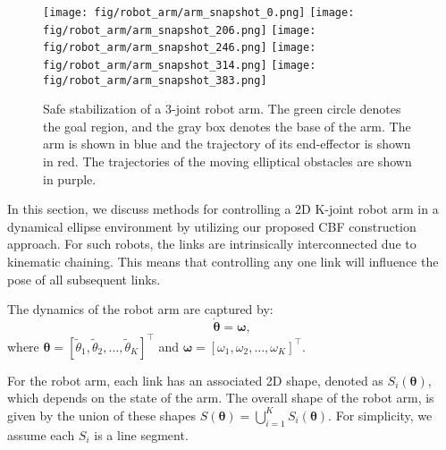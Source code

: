 \begin{figure*}[h]
    \centering
    {\texttt{[image: fig/robot\_arm/arm\_snapshot\_0.png]}}
    {\texttt{[image: fig/robot\_arm/arm\_snapshot\_206.png]}}
    {\texttt{[image: fig/robot\_arm/arm\_snapshot\_246.png]}}
    {\texttt{[image: fig/robot\_arm/arm\_snapshot\_314.png]}}
    {\texttt{[image: fig/robot\_arm/arm\_snapshot\_383.png]}}
    \caption{Safe stabilization of a 3-joint robot arm. The green circle denotes the goal region, and the gray box denotes the base of the arm. The arm is shown in blue and the trajectory of its end-effector is shown in red. The trajectories of the moving elliptical obstacles are shown in purple.}
    \label{fig:robot_arm_safety}
\end{figure*}

In this section, we discuss methods for controlling a 2D K-joint robot arm in a dynamical ellipse environment by utilizing our proposed CBF construction approach. For such robots, the links are intrinsically interconnected due to kinematic chaining. This means that controlling any one link will influence the pose of all subsequent links. 


The dynamics of the robot arm are captured by:
%
\begin{equation}
\label{eq: M_d_arm_dynamics}
    \dot{\boldsymbol{\theta}} = \boldsymbol{\omega},
\end{equation}
%
where \( \boldsymbol{\theta} = [\tilde{\theta}_1, \tilde{\theta}_2, \ldots, \tilde{\theta}_K]^\top \) and \( \boldsymbol{\omega} = [\omega_1, \omega_2, \ldots, \omega_K]^\top \).


For the robot arm, each link has an associated 2D shape, denoted as $ S_i (\boldsymbol{\theta}) $, which depends on the state of the arm. The overall shape of the robot arm, is given by the union of these shapes $S(\boldsymbol{\theta}) = \bigcup_{i=1}^{K} S_i(\boldsymbol{\theta})$. For simplicity, we assume each $S_i $ is a line segment.

